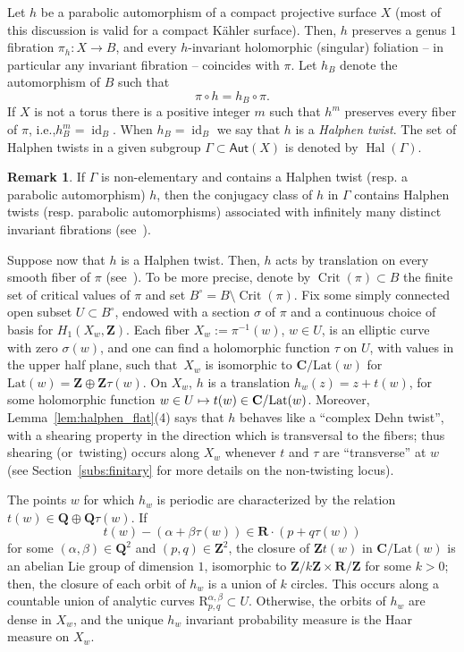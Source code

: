 \documentclass[11pt]{article}
\newcommand{\ie}{i.e.,\xspace}
\newcommand{\resp}{resp.\xspace}
\newcommand\mto{\mathchoice{\longmapsto}{\mapsto}{\mapsto}{\mapsto}}
\DeclareMathOperator{\Crit}{Crit}
\DeclareMathOperator{\id}{id}
\DeclareMathOperator{\Hal}{Hal}
\def\C{\mathbf{C}}
\def\R{\mathbf{R}}
\def\Q{\mathbf{Q}}
\def\Z{\mathbf{Z}}
\newcommand{\Lat}{{\mathrm{Lat}}}
\newcommand\Aut{\mathsf{Aut}}
\theoremstyle{plain}
\theoremstyle{definition}
\newtheorem{rem}[thm]{Remark}
\numberwithin{equation}{section}
\begin{document}
Let $h$ be a parabolic automorphism of a compact projective surface $X$ (most of this discussion is valid for a
compact Kähler surface). Then, $h$ preserves a genus $1$ fibration
$\pi_h\colon X\to B$, and every $h$-invariant holomorphic (singular) foliation -- in particular any invariant fibration -- coincides with $\pi$. Let $h_B$ denote the automorphism of $B$ such that
\begin{equation*}
\pi\circ h=h_B\circ \pi.
\end{equation*}
If $X$ is not a torus there is a positive integer $m$ such that $h^m$ preserves every fiber of $\pi$, \ie $h_B^m=\id_B$. When $h_B = \id_B$ we say that $h$ is a \emph{Halphen twist}. The set of Halphen twists in a given subgroup $\Gamma\subset \Aut(X)$ is denoted by $\Hal(\Gamma)$.

\begin{rem}\label{rem:many_parabolic}
If $\Gamma$ is non-elementary and contains a Halphen twist (\resp a parabolic automorphism) $h$, then the conjugacy class of $h$ in $\Gamma$ contains Halphen twists (\resp parabolic automorphisms) associated with infinitely many distinct invariant fibrations (see~\cite[\S 3.1]{finite_orbits}).
\end{rem}

Suppose now that $h$ is a Halphen twist.
Then, $h$ acts by translation on every smooth fiber of $\pi$ (see~\cite[\S 3]{invariant}).
To be more precise, denote by $\Crit(\pi)\subset B$ the finite set of critical values of $\pi$ and set $B^\circ= B\setminus \Crit(\pi)$.
Fix some simply connected open subset $U\subset B^\circ$, endowed with a section $\sigma$ of
$\pi$ and a continuous choice of basis for $H_1(X_w, \Z)$.
Each fiber $X_w:=\pi^{-1}(w)$, $w\in U$, is an elliptic curve with zero $\sigma(w)$, and one can find a holomorphic function $\tau$ on $U$, with values in the upper half plane, such that~$X_w$ is isomorphic to $\C/\Lat(w)$ for $\Lat(w)=\Z\oplus \Z\tau(w)$. On $X_w$, $h$ is a translation $h_w(z)=z+t(w)$, for some holomorphic function $w\in U\mto t(w)\in \C/\Lat(w)$. Moreover, Lemma~\ref{lem:halphen_flat}(4) says that $h$ behaves like a ``complex Dehn twist'', with a shearing property in the direction which is transversal to the fibers; thus shearing (or~twisting) occurs along $X_w$ whenever $t$ and $\tau$ are ``transverse'' at $w$
(see Section~\ref{subs:finitary} for more details on the non-twisting locus).

The points $w$ for which $h_w$ is periodic are characterized by the relation $t(w)\in \Q\oplus \Q\tau(w)$. If
\begin{equation*}
t(w)-(\alpha+\beta\tau(w))\in \R \cdot (p+q\tau(w))
\end{equation*}
for some $(\alpha,\beta)\in \Q^2$ and $(p,q)\in \Z^2$, the closure of $\Z t(w)$ in $\C/\Lat(w)$ is an abelian Lie group of dimension $1$,
isomorphic to $\Z / k\Z \times \R /\Z$ for some $k>0$; then, the closure of each orbit of $h_w$ is a union of $k$ circles. This occurs along a countable union of analytic curves $\mathrm{R}^{\alpha, \beta}_{p, q}\subset U$. Otherwise, the orbits of $h_w$ are dense in $X_w$, and the unique $h_w$ invariant probability
measure is the Haar measure on $X_w$.
\end{document}
